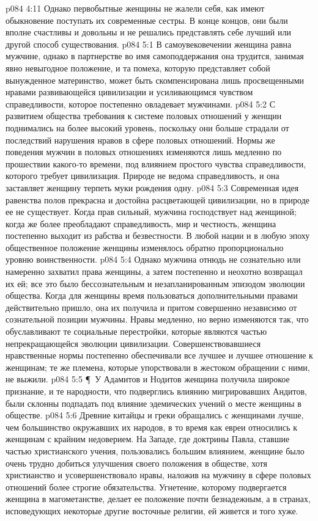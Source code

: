 \vs p084 4:11 Однако первобытные женщины не жалели себя, как имеют обыкновение поступать их современные сестры. В конце концов, они были вполне счастливы и довольны и не решались представлять себе лучший или другой способ существования.
\vs p084 5:1 В самоувековечении женщина равна мужчине, однако в партнерстве во имя самоподдержания она трудится, занимая явно невыгодное положение, и та помеха, которую представляет собой вынужденное материнство, может быть скомпенсирована лишь просвещенными нравами развивающейся цивилизации и усиливающимся чувством справедливости, которое постепенно овладевает мужчинами.
\vs p084 5:2 С развитием общества требования к системе половых отношений у женщин поднимались на более высокий уровень, поскольку они больше страдали от последствий нарушения нравов в сфере половых отношений. Нормы же поведения мужчин в половых отношениях изменяются лишь медленно по прошествии какого\hyp{}то времени, под влиянием простого чувства справедливости, которого требует цивилизация. Природе не ведома справедливость, и она заставляет женщину терпеть муки рождения одну.
\vs p084 5:3 Современная идея равенства полов прекрасна и достойна расцветающей цивилизации, но в природе ее не существует. Когда прав сильный, мужчина господствует над женщиной; когда же более преобладают справедливость, мир и честность, женщина постепенно выходит из рабства и безвестности. В любой нации и в любую эпоху общественное положение женщины изменялось обратно пропорционально уровню воинственности.
\vs p084 5:4 Однако мужчина отнюдь не сознательно или намеренно захватил права женщины, а затем постепенно и неохотно возвращал их ей; все это было бессознательным и незапланированным эпизодом эволюции общества. Когда для женщины время пользоваться дополнительными правами действительно пришло, она их получила и притом совершенно независимо от сознательной позиции мужчины. Нравы медленно, но верно изменяются так, что обуславливают те социальные перестройки, которые являются частью непрекращающейся эволюции цивилизации. Совершенствовавшиеся нравственные нормы постепенно обеспечивали все лучшее и лучшее отношение к женщинам; те же племена, которые упорствовали в жестоком обращении с ними, не выжили.
\vs p084 5:5 \P\ У Адамитов и Нодитов женщина получила широкое признание, и те народности, что подверглись влиянию мигрировавших Андитов, были склонны подпадать под влияние эдемических учений о месте женщины в обществе.
\vs p084 5:6 Древние китайцы и греки обращались с женщинами лучше, чем большинство окружавших их народов, в то время как евреи относились к женщинам с крайним недоверием. На Западе, где доктрины Павла, ставшие частью христианского учения, пользовались большим влиянием, женщине было очень трудно добиться улучшения своего положения в обществе, хотя христианство и усовершенствовало нравы, наложив на мужчину в сфере половых отношений более строгие обязательства. Угнетение, которому подвергается женщина в магометанстве, делает ее положение почти безнадежным, а в странах, исповедующих некоторые другие восточные религии, ей живется и того хуже.
